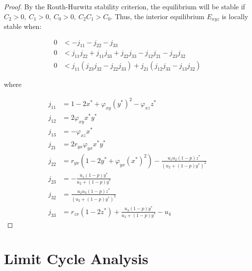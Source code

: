 \begin{proof}
    By the Routh-Hurwitz stability criterion, the equilibrium will be stable if $C_2>0,\ C_1>0,\ C_0>0,\ C_2C_1>C_0$. Thus, the interior equilibrium $E_{xyz}$ is locally stable when:

    \begin{align*}
        0 &< -j_{11}-j_{22}-j_{33}\\
        0 &< j_{11}j_{22}+j_{11}j_{33}+j_{22}j_{33}-j_{12}j_{21}-j_{23}j_{32}\\
        0 &< j_{11}\left(j_{23}j_{32}-j_{22}j_{33}\right)+j_{21}\left(j_{12}j_{33}-j_{13}j_{32}\right)
    \end{align*}

    where
    
    \begin{align*}
        j_{11} &= 1-2x^*+\varphi_{xy}\left(y^*\right)^2-\varphi_{xz}z^*\\
        j_{12} &= 2\varphi_{xy}x^*y^*\\
        j_{13} &= -\varphi_{xz}x^*\\
        j_{21} &= 2r_{yx}\varphi_{yx}x^*y^*\\
        j_{22} &= r_{yx}\left(1-2y^*+\varphi_{yx}\left(x^*\right)^2\right)-\frac{u_1u_2\left(1-p\right)z^*}{\left(u_2+\left(1-p\right)y^*\right)^2}\\
        j_{23} &= -\frac{u_1\left(1-p\right)y^*}{u_2+\left(1-p\right)y^*}\\
        j_{32} &= \frac{u_2u_3\left(1-p\right)z^*}{\left(u_2+\left(1-p\right)y^*\right)^2}\\
        j_{33} &= r_{zx}\left(1-2z^*\right)+\frac{u_3\left(1-p\right)y^*}{u_2+\left(1-p\right)y^*}-u_4
    \end{align*}
\end{proof}

\section{Limit Cycle Analysis}
